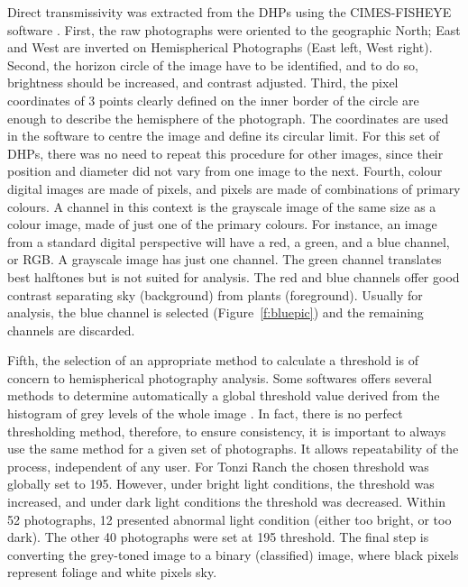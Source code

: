 \documentclass[a4paper,11pt]{report}
\begin{document}
Direct transmissivity was extracted from the DHPs using the CIMES-FISHEYE software \citep{Walter2012}. First, the raw photographs were oriented to the geographic North; East and West are inverted on Hemispherical Photographs (East left, West right). Second, the horizon circle of the image have to be identified, and to do so, brightness should be increased, and contrast adjusted. Third, the pixel coordinates of 3 points clearly defined on the inner border of the circle are enough to describe the hemisphere of the photograph. The coordinates are used in the software to centre the image and define its circular limit. For this set of DHPs, there was no need to repeat this procedure for other images, since their position and diameter did not vary from one image to the next. Fourth, colour digital images are made of pixels, and pixels are made of combinations of primary colours. A channel in this context is the grayscale image of the same size as a colour image, made of just one of the primary colours. For instance, an image from a standard digital perspective will have a red, a green, and a blue channel, or RGB. A grayscale image has just one channel. The green channel translates best halftones but is not suited for analysis. The red and blue channels offer good contrast separating sky (background) from plants (foreground). Usually for analysis, the blue channel is selected (Figure~\ref{f:bluepic}) and the remaining channels are discarded. 

Fifth, the selection of an appropriate method to calculate a threshold is of concern to hemispherical photography analysis. Some softwares offers several methods to determine automatically a global threshold value derived from the histogram of grey levels of the whole image \citep{Ridler1978}. In fact, there is no perfect thresholding method, therefore, to ensure consistency, it is important to always use the same method for a given set of photographs. It allows repeatability of the process, independent of any user. For Tonzi Ranch the chosen threshold was globally set to 195. However, under bright light conditions, the threshold was increased, and under dark light conditions the threshold was decreased. Within 52 photographs, 12 presented abnormal light condition (either too bright, or too dark). The other 40 photographs were set at 195 threshold. The final step is converting the grey-toned image to a binary (classified) image, where black pixels represent foliage and white pixels sky.
\end{document}

